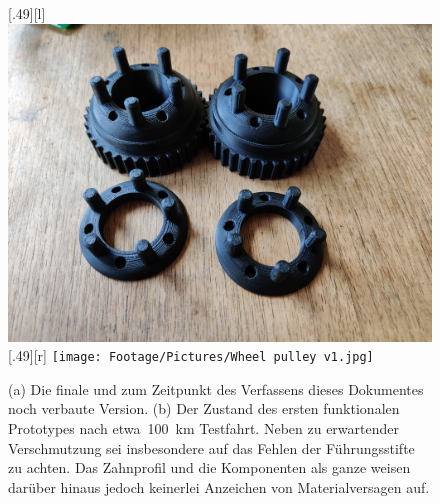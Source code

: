 		\begin{figure}[h]
			\centering
			[.49\textwidth][l]{
				\includegraphics[angle=180, width=.49\textwidth]{Footage/Pictures/Wheel pulley v2.jpg}
			}
			[.49\textwidth][r]{
				\texttt{[image: Footage/Pictures/Wheel pulley v1.jpg]}
			}
			\caption[Vergleich der gedruckten Zahn- und Konterscheiben vor und nach mehreren Testfahrten]{(a) Die finale und zum Zeitpunkt des Verfassens dieses Dokumentes noch verbaute Version. (b) Der Zustand des ersten funktionalen Prototypes nach etwa~\qty{100}{\kilo\metre} Testfahrt. Neben zu erwartender Verschmutzung sei insbesondere auf das Fehlen der Führungsstifte zu achten. Das Zahnprofil und die Komponenten als ganze weisen darüber hinaus jedoch keinerlei Anzeichen von Materialversagen auf.}
			\label{fig:comparison printed parts used unused}
		\end{figure}
